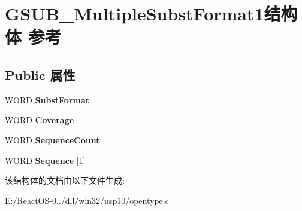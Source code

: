 \hypertarget{struct_g_s_u_b___multiple_subst_format1}{}\section{G\+S\+U\+B\+\_\+\+Multiple\+Subst\+Format1结构体 参考}
\label{struct_g_s_u_b___multiple_subst_format1}
\subsection*{Public 属性}
\begin{DoxyCompactItemize}
\item 
\mbox{\label{struct_g_s_u_b___multiple_subst_format1_ab398345331aa20aa1e14c993ff2788b7}} 
W\+O\+RD {\bfseries Subst\+Format}
\item 
\mbox{\label{struct_g_s_u_b___multiple_subst_format1_a047f022ee79fd5cb7a1a59240327668b}} 
W\+O\+RD {\bfseries Coverage}
\item 
\mbox{\label{struct_g_s_u_b___multiple_subst_format1_a9a3cc6b10d64fe7714d1b087615470dc}} 
W\+O\+RD {\bfseries Sequence\+Count}
\item 
\mbox{\label{struct_g_s_u_b___multiple_subst_format1_a237f2ccfd979fdfb049902eefc2910ab}} 
W\+O\+RD {\bfseries Sequence} \mbox{[}1\mbox{]}
\end{DoxyCompactItemize}


该结构体的文档由以下文件生成\+:\begin{DoxyCompactItemize}
\item 
E\+:/\+React\+O\+S-\/0../dll/win32/usp10/opentype.\+c\end{DoxyCompactItemize}
